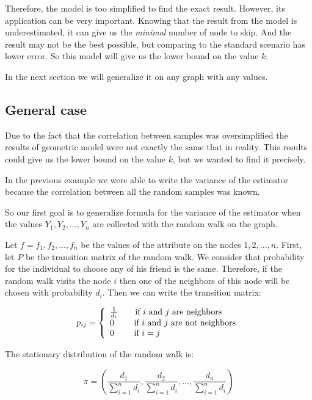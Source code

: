 \documentclass[12pt]{report}
\begin{document}
Therefore, the model is too simplified to find the exact result. However, its application can be very important. Knowing that the result from the model is underestimated, it can give us the \textit{minimal} number of node to skip. And the result may not be the best possible, but comparing to the standard scenario has lower error. So this model will give us the lower bound on the value $k$.

In the next section we will generalize it on any graph with any values.
\subsection{General case}

Due to the fact that the correlation between samples was oversimplified the results of geometric model were not exactly the same that in reality. This results could give us the lower bound on the value $k$, but we wanted to find it precisely. 

In the previous example we were able to write the variance of the estimator because the correlation between all the random samples was known. 

So our first goal is to generalize formula for the variance of the estimator when the values $Y_1, Y_2, ..., Y_n$ are collected with the random walk on the graph.

Let $f = {f_1 , f_2, ..., f_n}$ be the values of the attribute on the nodes $1, 2, ..., n$.
First, let $P$ be the transition matrix of the random walk. We consider that probability for the individual to choose any of his friend is the same. Therefore, if the random walk visits the node $i$ then one of the neighbors of this node will be chosen with probability $d_i$. Then we can write the transition matrix:


\[
    p_{ij}=\left\{
                \begin{array}{ll}
                  \frac{1}{d_i} \qquad \textnormal{if $i$ and $j$ are neighbors} \\
                  0 \qquad \textnormal{ if $i$ and $j$ are not neighbors}\\
                  0 \qquad \textnormal{ if $i = j$}
                \end{array}
              \right.
  \]
  
The stationary distribution of the random walk is:

$$\pi = \left( \frac{d_1}{\sum_{i=1}^n d_i}, \frac{d_2}{\sum_{i=1}^n d_i},..., \frac{d_n}{\sum_{i=1}^n d_i}\right)$$
  
\end{document}
